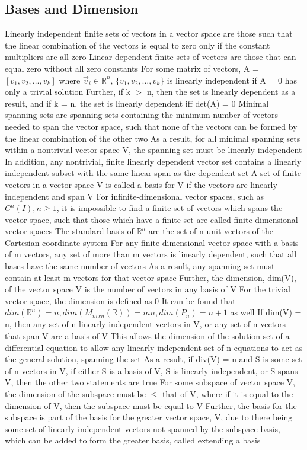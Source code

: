 \documentclass[11 pt, twoside]{article}
\newenvironment{outline*}
{
	\begin{outline}[enumerate]
	}
	{\end{outline}
}
\begin{document}
\subsection{Bases and Dimension}
\begin{outline*}
\1 Linearly independent finite sets of vectors in a vector space are those such that the linear combination of the vectors is equal to zero only if the constant multipliers are all zero
\2 Linear dependent finite sets of vectors are those that can equal zero without all zero constants
\2 For some matrix of vectors, A = $[v_1, v_2, \dots, v_k]$ where $\vec{v}_i \in \mathbb{R}^n$, $\{v_1, v_2, \dots, v_k\}$ is linearly independent if A = 0 has only a trivial solution
\3 Further, if k $>$ n, then the set is linearly dependent as a result, and if k = n, the set is linearly dependent iff det(A) = 0
\1 Minimal spanning sets are spanning sets containing the minimum number of vectors needed to span the vector space, such that none of the vectors can be formed by the linear combination of the other two
\2 As a result, for all minimal spanning sets within a nontrivial vector space V, the spanning set must be linearly independent
\2 In addition, any nontrivial, finite linearly dependent vector set contains a linearly independent subset with the same linear span as the dependent set
\1 A set of finite vectors in a vector space V is called a basis for V if the vectors are linearly independent and span V
\2 For infinite-dimensional vector spaces, such as $C^n(I), n \geq 1$, it is impossible to find a finite set of vectors which spans the vector space, such that those which have a finite set are called finite-dimensional vector spaces
\2 The standard basis of $\mathbb{R}^n$ are the set of n unit vectors of the Cartesian coordinate system
\1 For any finite-dimensional vector space with a basis of m vectors, any set of more than m vectors is linearly dependent, such that all bases have the same number of vectors
\2 As a result, any spanning set must contain at least m vectors for that vector space
\2 Further, the dimension, dim(V), of the vector space V is the number of vectors in any basis of V
\3 For the trivial vector space, the dimension is defined as 0
\3 It can be found that $dim(\mathbb{R}^n) = n, dim(M_{mxn}(\mathbb{R})) = mn, dim(P_n) = n + 1$ as well
\2 If dim(V) = n, then any set of n linearly independent vectors in V, or any set of n vectors that span V are a basis of V
\3 This allows the dimension of the solution set of a differential equation to allow any linearly independent set of n equations to act as the general solution, spanning the set
\3 As a result, if div(V) = n and S is some set of n vectors in V, if either S is a basis of V, S is linearly independent, or S spans V, then the other two statements are true
\2 For some subspace of vector space V, the dimension of the subspace must be $\leq$ that of V, where if it is equal to the dimension of V, then the subspace must be equal to V
\3 Further, the basis for the subspace is part of the basis for the greater vector space, V, due to there being some set of linearly independent vectors not spanned by the subspace basis, which can be added to form the greater basis, called extending a basis
\end{outline*}
\end{document}
